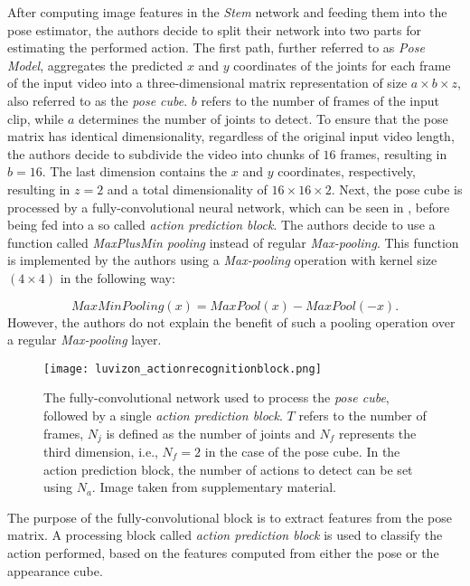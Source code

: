 After computing image features in the \textit{Stem} network and feeding them into the pose estimator, the authors decide to split their network into two parts for estimating the performed action.
The first path, further referred to as \textit{Pose Model}, aggregates the predicted $x$ and $y$ coordinates of the joints for each frame of the input video into a three-dimensional matrix representation of size $a \times b \times z$, also referred to as the \textit{pose cube}.
$b$ refers to the number of frames of the input clip, while $a$ determines the number of joints to detect.
To ensure that the pose matrix has identical dimensionality, regardless of the original input video length, the authors decide to subdivide the video into chunks of $16$ frames, resulting in $b=16$.
The last dimension contains the $x$ and $y$ coordinates, respectively, resulting in $z=2$ and a total dimensionality of $16 \times 16 \times 2$.
Next, the pose cube is processed by a fully-convolutional neural network, which can be seen in , before being fed into a so called \textit{action prediction block}.
The authors decide to use a function called \textit{MaxPlusMin pooling} instead of regular \textit{Max-pooling}.
This function is implemented by the authors using a \textit{Max-pooling} operation with kernel size $(4 \times 4)$ in the following way:

\begin{equation}
    MaxMinPooling(x) = MaxPool(x) - MaxPool(-x).
\end{equation}
However, the authors do not explain the benefit of such a pooling operation over a regular \textit{Max-pooling} layer.

\begin{figure}[htb!]
    \centering
    \texttt{[image: luvizon\_actionrecognitionblock.png]}
    \caption{The fully-convolutional network used to process the \textit{pose cube}, followed by a single \textit{action prediction block}. $T$ refers to the number of frames, $N_j$ is defined as the number of joints and $N_f$ represents the third dimension, i.e., $N_f = 2$ in the case of the pose cube. In the action prediction block, the number of actions to detect can be set using $N_a$. Image taken from \cite{luvizon_2d/3d_2018} supplementary material.}
    \label{fig:luvizon_actionrecognitionblock}
\end{figure}

The purpose of the fully-convolutional block is to extract features from the pose matrix.
A processing block called \textit{action prediction block} is used to classify the action performed, based on the features computed from either the pose or the appearance cube. 

